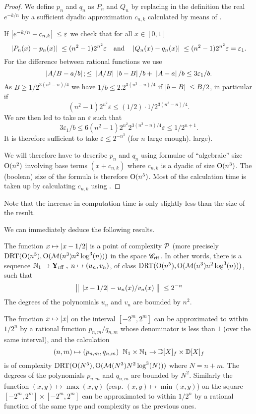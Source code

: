 \begin{proof} We define $p_n$ and $q_n$ as $P_n$ and $Q_n$ by replacing in the definition the real $e^{-k/n}$ by a sufficient dyadic approximation $c_{n,k}$  calculated by means of . 

\noindent 
If $\left|{e^{-k/n}-c_{n,k}}\right|\;\leq \varepsilon$ we check that for all $x\in [0,1]$ 
\[
\left|{P_n(x) - p_n(x)}\right|\;  \leq  (n^{2}-1) 2^{n^2} \varepsilon  \quad  
{\rm  and}   \quad  \left|{Q_n(x)- q_n(x)}\right|\; \leq  (n^2-1) 2^{n^2} \varepsilon  = \varepsilon_1. 
\]
For the difference between rational functions we use
\[
\left|{A/B - a/b}\right|;  \leq \;  
\left|{A/B}\right| \;  \left|{b - B}\right|  / b + \; \left|{A - a}\right|  / b 
\leq   3 \varepsilon_1/ b. 
\]
As $ B \geq 1/2^{3(n^3-n)/4}$ we have $1/b \leq 2.2^{3(n^3-n)/4}$ if 
$\left|{b - B}\right|\;\leq  B/2$, in particular if 
\[
(n^{2}-1) 2^{n^2} \varepsilon \leq (1/2) \cdot 1/2^{3(n^3-n)/4}.
\]
We are then led to take an $\varepsilon $ such that 
\[
3\varepsilon_1/b\leq 6(n^{2}-1)2^{n^2}2^{3(n^3-n)/4}\varepsilon 
\leq 1/2^{n+1}.
\]
It is therefore sufficient to take $\varepsilon \leq 2 ^{-n^3}$ (for $n$ large enough). 
large).

\noindent 
We will therefore have to describe $p_n$ and $q_n$ using formulae of 
``algebraic'' size ${\rm O}(n^2)$ involving base terms $(x+c_{n,k})$ 
where $c_{n,k}$ is a dyadic of size ${\rm O}(n^3)$. 
The (boolean) size of the formula is therefore ${\rm O}(n^5)$. 
Most of the calculation time is taken up by calculating $c_{n,k}$ using . 
\end{proof}


Note that the increase in computation time is only slightly less than the 
size of the result.

We can immediately deduce the following results.

\begin{theorem} \label{334}
The function $x \mapsto \left|{ x - 1/2 }\right|$ is a point of complexity ${\cal P}$ (more precisely ${\rm DRT}({\rm O}(n^5), {\rm O}({{{\cal M}}}(n^3) n^2 \log^3(n)))$ 
in the space ${{{\mathscr C}}_{\rm rff}}$. 
In other words, there is a sequence 
$\mathbb {N}_1 \to {{\bf Y}_{\rm rff}} \; , \; n \mapsto (u_n,v_n)$, of class
 ${\rm DRT}({\rm O}(n^5), {\rm O}({{{\cal M}}}(n^3) n^2 \log^3(n)))$, such that 
\[
\big\lVert  \; \left|{ x-1/2 }\right| - u_n(x)/v_n(x) \; \big\rVert \; \leq 2^{-n}
\]
The degrees of the polynomials $u_n$ and $v_n$ are bounded by $n^2$.
\end{theorem}

\begin{proposition} \label{335}
The function $x \mapsto \left|{x}\right|$ on the interval $[-2^m , 2^m]$ can be approximated to within $1/2^n$ by a rational function $p_{n,m}/q_{n,m}$ whose denominator is less than $1$ (over the same 
interval), and the calculation 
\[
(n,m) \mapsto (p_{n,m},q_{n,m}) \; \; \mathbb {N}_1 \times \mathbb {N}_1 \to
 \mathbb {D}[X]_f \times \mathbb {D}[X]_f 
\] 
is of complexity ${\rm DRT}({\rm O}(N^5), {\rm O}({{{\cal M}}}(N^3) N^2 \log^3(N)))$ 
where $N = n+m$. The degrees of the polynomials 
$p_{n,m}$ and $q_{n,m}$ are bounded by $N^2$.
Similarly the function $(x,y) \mapsto \max(x,y)$ 
(resp. $(x,y) \mapsto \min(x,y)$) on the square 
$[-2^m,2^m] \times [-2^m,2^m]$ can be approximated to within $1/2^n$  
by a rational function of the same type and complexity 
as the previous ones.
\end{proposition}

